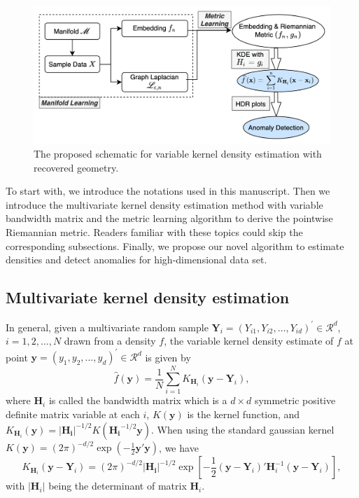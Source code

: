 \documentclass[11pt,a4paper,]{article}
\begin{document}
\begin{figure}

{\centering \includegraphics[width=0.95\linewidth]{figures/vkde} 

}

\caption{The proposed schematic for variable kernel density
estimation with recovered geometry.}\label{fig:vkde}
\end{figure}

To start with, we introduce the notations used in this manuscript. Then
we introduce the multivariate kernel density estimation method with
variable bandwidth matrix and the metric learning algorithm to derive
the pointwise Riemannian metric. Readers familiar with these topics
could skip the corresponding subsections. Finally, we propose our novel
algorithm to estimate densities and detect anomalies for
high-dimensional data set.

\hypertarget{multivariate-kernel-density-estimation}{%
\subsection{Multivariate kernel density estimation}\label{multivariate-kernel-density-estimation}}

In general, given a multivariate random sample
\(\pmb{Y}_i=(Y_{i1}, Y_{i2}, \dots, Y_{id})^\prime \in \mathcal{R}^d\),
\(i = 1, 2, \dots, N\) drawn from a density \(f\), the variable kernel
density estimate of \(f\) at point
\(\pmb{y}=(y_1, y_2, \dots, y_d)^\prime \in \mathcal{R}^d\) is given by
\begin{equation}
\label{eq:kde}
\hat{f}(\pmb{y})=\frac{1}{N}\sum\limits_{i=1}^N K_{\pmb{H}_i}(\pmb{y}-\pmb{Y}_i),
\end{equation} where \(\pmb{H}_i\) is called the bandwidth matrix which is
a \(d\times d\) symmetric positive definite matrix variable at each \(i\),
\(K(\pmb{y})\) is the kernel function, and
\(K_{\pmb{H}_i}(\pmb{y}) = |\pmb{H_i}|^{-1/2} K(\pmb{H_i}^{-1/2}\pmb{y})\).
When using the standard gaussian kernel
\(K(\pmb{y}) = (2\pi)^{-d/2}\exp(-\frac{1}{2}\pmb{y}'\pmb{y})\), we have
\begin{equation}
\label{eq:kernel}
K_{\pmb{H}_i}(\pmb{y}-\pmb{Y}_i)=(2\pi)^{-d/2}|\pmb{H_i}|^{-1/2}\exp\left[-\frac{1}{2}(\pmb{y}-\pmb{Y}_i)'\pmb{H}_i^{-1}(\pmb{y}-\pmb{Y}_i)\right],
\end{equation} with \(|\pmb{H}_i|\) being the determinant of matrix
\(\pmb{H}_i\).
\end{document}
